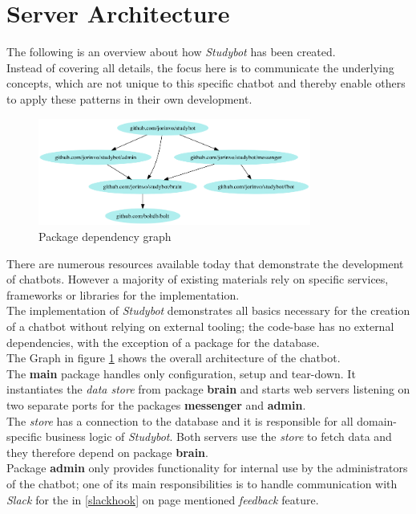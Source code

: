 \section{Server Architecture}


The following is an overview about how \emph{Studybot} has been created.
\\
Instead of covering all details, the focus here is to communicate the underlying concepts,
which are not unique to this specific chatbot and thereby enable others to apply these patterns in their own development.
\\

\begin{figure}[h]
  \centering
  \includegraphics[width=0.8\textwidth]{images/internal-deps.png}
  \caption{Package dependency graph\protect\footnotemark}
	\label{fig:internal-deps}
\end{figure}

There are numerous resources available today that demonstrate the development of chatbots.
However a majority of existing materials rely on specific services, frameworks or libraries for the implementation.
\\
The implementation of \emph{Studybot} demonstrates all basics necessary for the creation of a chatbot
without relying on external tooling;
the code-base has no external dependencies, with the exception of a package for the database.
\\

The Graph in figure \ref{fig:internal-deps} shows the overall architecture of the chatbot.
\\
The \textbf{main} package handles only configuration, setup and tear-down.
It instantiates the \emph{data store} from package \textbf{brain}
and starts web servers listening on two separate ports for the packages \textbf{messenger} and \textbf{admin}.
\\

The \emph{store} has a connection to the database and it is responsible for all domain-specific business logic of \emph{Studybot}.
Both servers use the \emph{store} to fetch data and they therefore depend on package \textbf{brain}.
\\
Package \textbf{admin} only provides functionality for internal use by the administrators of the chatbot;
one of its main responsibilities is to handle communication with \emph{Slack}
for the in \ref{slackhook} on page \pageref{slackhook} mentioned \emph{feedback} feature.
\\

